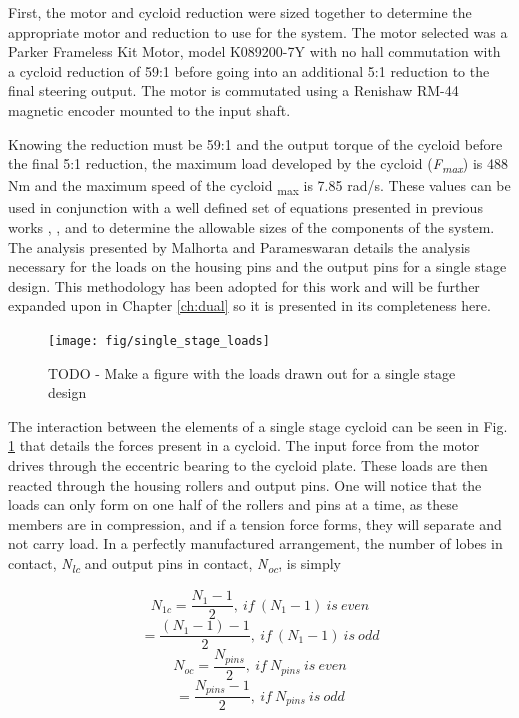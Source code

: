 First, the motor and cycloid reduction were sized together to determine the appropriate motor and reduction to use for the system. The motor selected was a Parker Frameless Kit Motor, model K089200-7Y with no hall commutation with a cycloid reduction of 59:1 before going into an additional 5:1 reduction to the final steering output. The motor is commutated using a Renishaw RM-44 magnetic encoder mounted to the input shaft. 

Knowing the reduction must be 59:1 and the output torque of the cycloid before the final 5:1 reduction, the maximum load developed by the cycloid (\textit{F\textsubscript{max}}) is 488 Nm and the maximum speed of the cycloid {\textomega\textsubscript{max}} is 7.85 rad/s. These values can be used in conjunction with a well defined set of equations presented in previous works \cite{ref:malhorta}, \cite{ref:li}, and \cite{ref:unified_approach} to determine the allowable sizes of the components of the system. The analysis presented by Malhorta and Parameswaran details the analysis necessary for the loads on the housing pins and the output pins for a single stage design. This methodology has been adopted for this work and will be further expanded upon in Chapter \ref{ch:dual} so it is presented in its completeness here. 

\begin{figure}[h]
   \centering
   \texttt{[image: fig/single\_stage\_loads]}
   \caption{TODO - Make a figure with the loads drawn out for a single stage design}
   \label{fig:single_loads}
\end{figure}

The interaction between the elements of a single stage cycloid can be seen in Fig. \ref{fig:single_loads} that details the forces present in a cycloid. The input force from the motor drives through the eccentric bearing to the cycloid plate. These loads are then reacted through the housing rollers and output pins. One will notice that the loads can only form on one half of the rollers and pins at a time, as these members are in compression, and if a tension force forms, they will separate and not carry load. In a perfectly manufactured arrangement, the number of lobes in contact, \textit{N\textsubscript{lc}} and output pins in contact, \textit{N\textsubscript{oc}}, is simply 

\begin{equation}
N_{1c} = \frac{N_{1} - 1}{2},\ if\ (N_1 -1)\ is\ even 
\end{equation}
\begin{equation}
= \frac{(N_{1}-1) - 1}{2},\ if\ (N_{1} - 1)\ is\ odd 
\end{equation}
\begin{equation}
N_{oc} = \frac{N_{pins}}{2},\ if\ N_{pins}\ is\ even 
\end{equation}
\begin{equation}
= \frac{N_{pins} - 1}{2},\ if\ N_{pins}\ is\ odd 
\end{equation}

